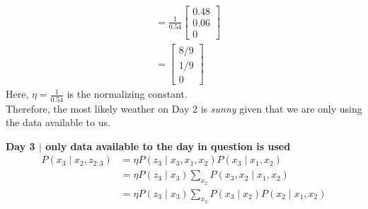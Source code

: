 \documentclass[answers]{exam}
\begin{document}
\begin{questions}
\begin{parts}
\begin{solution}
\begin{align*}
                                     & = \frac{1}{0.54} \begin{bmatrix}
                                                            0.48 \\
                                                            0.06 \\
                                                            0
                                                        \end{bmatrix}                      \\
                                     & = \begin{bmatrix}
                                             8/9 \\
                                             1/9 \\
                                             0
                                         \end{bmatrix}
            \end{align*}
            Here, \(\eta = \frac{1}{0.54}\) is the normalizing constant. \\
            Therefore, the most likely weather on Day 2 is \textit{sunny} given that we are only using the data available to us.

            \textbf{Day 3 $\mid$ only data available to the day in question is used}
            \begin{align*}
                P(x_3 \mid x_2, z_{2:3}) & = \eta P(z_3 \mid x_3, x_1, x_2) P(x_3 \mid x_1, x_2)                  \\
                                         & = \eta P(z_3 \mid x_3) \sum_{x_2} P(x_3, x_2 \mid x_1, x_2)            \\
                                         & = \eta P(z_3 \mid x_3) \sum_{x_2} P(x_3 \mid x_2) P(x_2 \mid x_1, x_2)
            \end{align*}


\end{solution}
\end{parts}
\end{questions}
\end{document}
